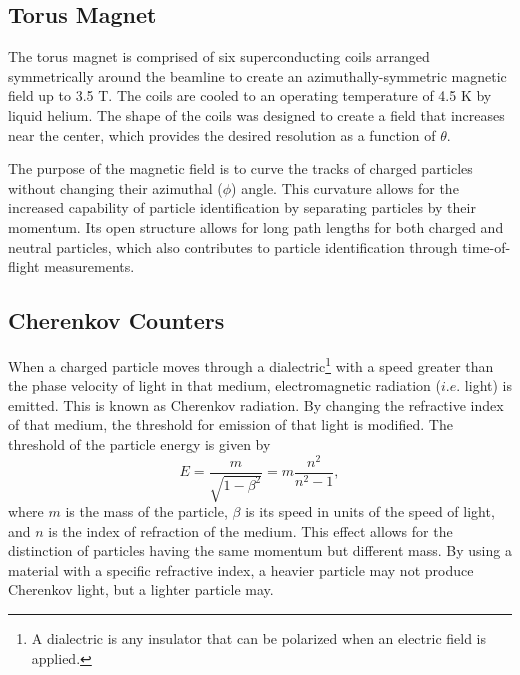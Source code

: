 \subsection{Torus Magnet}
The torus magnet is comprised of six superconducting coils arranged symmetrically around the beamline to create an azimuthally-symmetric magnetic field up to 3.5 T. The coils are cooled to an operating temperature of 4.5 K by liquid helium.\cite{clas12:mags} The shape of the coils was designed to create a field that increases near the center, which provides the desired resolution as a function of $\theta$.

The purpose of the magnetic field is to curve the tracks of charged particles without changing their azimuthal ($\phi$) angle. This curvature allows for the increased capability of particle identification by separating particles by their momentum. Its open structure allows for long path lengths for both charged and neutral particles, which also contributes to particle identification through time-of-flight measurements.

\subsection{Cherenkov Counters}
When a charged particle moves through a dialectric\footnote{A dialectric is any insulator that can be polarized when an electric field is applied.} with a speed greater than the phase velocity of light in that medium, electromagnetic radiation ($i.e.$ light) is emitted. This is known as Cherenkov radiation. By changing the refractive index of that medium, the threshold for emission of that light is modified. The threshold of the particle energy is given by \cite{clas12:HTCC}
\begin{equation}
E = \frac{m}{\sqrt{1-\beta^2}} = m\frac{n^2}{n^2-1},
\end{equation}
where $m$ is the mass of the particle, $\beta$ is its speed in units of the speed of light, and $n$ is the index of refraction of the medium. This effect allows for the distinction of particles having the same momentum but different mass. By using a material with a specific refractive index, a heavier particle may not produce Cherenkov light, but a lighter particle may.

